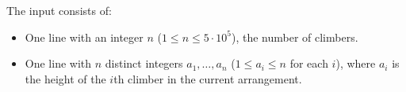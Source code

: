 
    The input consists of:
    \begin{itemize}
        \item One line with an integer $n$ ($1\leq n\leq 5 \cdot 10^5$), the number of
			climbers.
        \item One line with $n$ distinct integers $a_1, \ldots, a_n$ ($1 \leq a_i \leq n$ for each $i$), where $a_i$ is the height of the $i$th climber in the current arrangement.
    \end{itemize}
